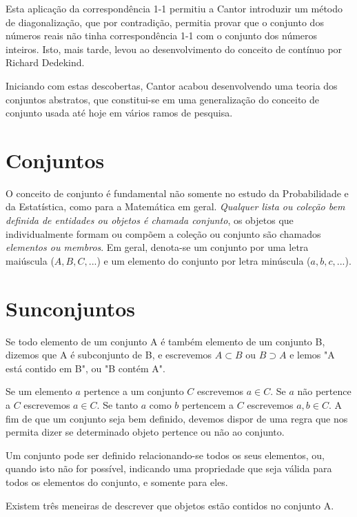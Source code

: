 \documentclass[a4paper,12pt]{report}
\begin{document}
{Esta aplicação da correspondência 1-1 permitiu a Cantor introduzir
um método de diagonalização, que por contradição, permitia provar
que o conjunto dos números reais não tinha correspondência 1-1 com
o conjunto dos números inteiros. Isto, mais tarde, levou ao
desenvolvimento do conceito de contínuo por Richard
Dedekind.\vskip0.3cm

Iniciando com estas descobertas, Cantor acabou desenvolvendo uma
teoria dos conjuntos abstratos, que constitui-se em uma
generalização do conceito de conjunto usada até hoje em vários
ramos de pesquisa.\vskip0.3cm

\section{Conjuntos}

O conceito de conjunto é fundamental não somente no estudo da
Probabilidade e da Estatística, como para a Matemática em geral.
\emph{Qualquer lista ou coleção bem definida de entidades ou
objetos é chamada conjunto}, os objetos que individualmente formam
ou compõem a coleção ou conjunto são chamados \emph{elementos ou
membros}. Em geral, denota-se um conjunto por uma letra maiúscula
($A,B,C,...$) e um elemento do conjunto por letra minúscula
($a,b,c,...$).\vskip0.3cm

\section{Sunconjuntos}

Se todo elemento de um conjunto A é também elemento de um conjunto
B, dizemos que A é subconjunto de B, e escrevemos $A \subset B $
ou $B \supset A$ e lemos "A está contido em B", ou "B contém
A".\vskip0.3cm

Se um elemento $a$ pertence a um conjunto $C$ escrevemos $a \in
C$. Se $a$ não pertence a $C$ escrevemos $a \in C$. Se tanto $a$
como $b$ pertencem a $C$ escrevemos $a,b \in C$. A fim de que um
conjunto seja bem definido, devemos dispor de uma regra que nos
permita dizer se determinado objeto pertence ou não ao
conjunto.\vskip0.3cm

Um conjunto pode ser definido relacionando-se todos os seus
elementos, ou, quando isto não for possível, indicando uma
propriedade que seja válida para todos os elementos do conjunto, e
somente para eles.\vskip0.3cm


Existem três meneiras de descrever que objetos estão contidos no
conjunto A.

}
\end{document}
